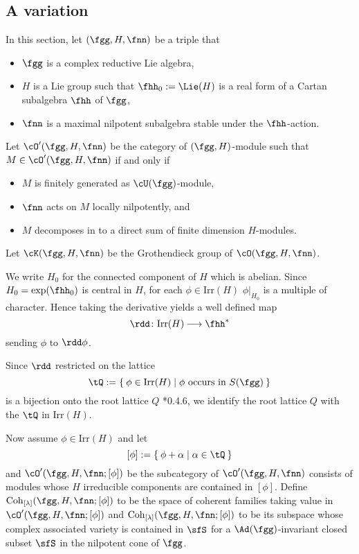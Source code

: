 \documentclass[12pt,a4paper]{amsart}
\numberwithin{equation}{section}
\theoremstyle{remark}
\def\Irr{\mathrm{Irr}}
\def\Coh{\mathrm{Coh}}
\def\dphi{\rdd \phi}
\newcommand{\Grt}{\cK}
\begin{document}
\subsection{A variation}
In this section, let
$(\fgg, H,\fnn)$ be a triple that
\begin{itemize}
  \item $\fgg$ is a complex reductive Lie algebra,
  \item $H$ is a Lie group such that
        $\fhh_{0}:= \Lie(H)$ is a real form of
       a Cartan subalgebra  $\fhh$ of $\fgg$,
  \item $\fnn$ is a maximal nilpotent subalgebra
        stable under the $\fhh$-action.
\end{itemize}
Let $\cO'(\fgg, H,\fnn)$ be the category of $(\fgg, H)$-module such that
$M\in \cO'(\fgg,H,\fnn)$
if and only if
\begin{itemize}
  \item $M$ is finitely generated as $\cU(\fgg)$-module,
  \item $\fnn$ acts on $M$ locally nilpotently, and
  \item $M$ decomposes in to a direct sum of finite dimension $H$-modules.
\end{itemize}
Let $\Grt(\fgg,H,\fnn)$ be the Grothendieck group of $\cO(\fgg,H,\fnn)$.

We write $H_{0}$ for the connected component of $H$ which is abelian.
Since $H_{0} = \exp(\fhh_{0})$ is central in $H$, for each $\phi\in \Irr(H)$
$\phi|_{H_{0}}$ is a multiple of character.
Hence taking the derivative yields a
well defined map
\[
\rdd \colon \Irr(H)\longrightarrow \fhh^{*}
\]
sending $\phi$ to $\dphi$.


Since $\rdd$ restricted on the lattice
\[
\tQ:=\Set{\phi\in \Irr(H)|\phi \text{
    occurs in } S(\fgg)}
\]
 is a bijection onto the root lattice $Q$ \cite{Vg}*{0.4.6}, we identify the root lattice $Q$ with the $\tQ$ in $\Irr(H)$.


Now assume $\phi\in \Irr(H)$ and let
\[
  [\phi] := \Set{\phi+\alpha| \alpha\in \tQ}
\]
and
$\cO'(\fgg,H,\fnn;[\phi])$ be the subcategory of $\cO'(\fgg,H,\fnn)$
consists of modules whose $H$ irreducible components are contained in $[\phi]$.
Define $\Coh_{[\lambda]}(\fgg,H,\fnn;[\phi])$ to be the space of coherent
families taking value in $\cO'(\fgg,H,\fnn;[\phi])$ and
$\Coh_{[\lambda]}(\fgg,H,\fnn;[\phi])$ to be its subspace whose complex
associated variety is contained in $\sfS$ for a $\Ad(\fgg)$-invariant closed subset $\sfS$ in the nilpotent cone of
$\fgg$.
\end{document}
